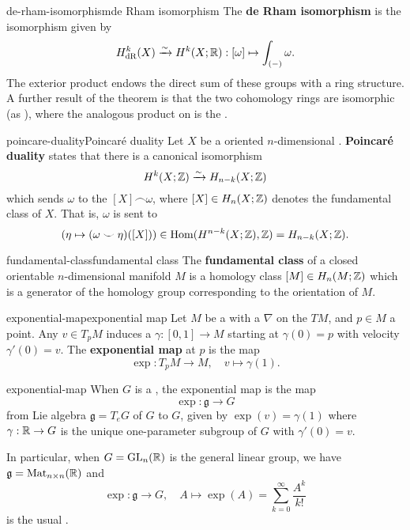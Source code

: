 
\begin{topic}{de-rham-isomorphism}{de Rham isomorphism}
    The \textbf{de Rham isomorphism} is the isomorphism given by
    \[ H_{\textup{dR}}^k(X) \xrightarrow{\sim} H^k(X; \mathbb{R}) : [ \omega ] \mapsto \int_{(-)} \omega . \]
    The exterior product endows the direct sum of these groups with a ring structure. A further result of the theorem is that the two cohomology rings are isomorphic (as ), where the analogous product on  is the .
\end{topic}

\begin{topic}{poincare-duality}{Poincaré duality}
    Let $X$ be a  oriented $n$-dimensional . \textbf{Poincaré duality} states that there is a canonical isomorphism
    \[ H^k(X; \mathbb{Z}) \xrightarrow{\sim} H_{n - k}(X; \mathbb{Z}) \]
    which sends $\omega$ to the  $[X] \frown \omega$, where $[X] \in H_n(X; \mathbb{Z})$ denotes the fundamental class of $X$. That is, $\omega$ is sent to
    \[ (\eta \mapsto (\omega \smile \eta)([X])) \in \text{Hom}(H^{n - k}(X; \mathbb{Z}), \mathbb{Z}) = H_{n - k}(X; \mathbb{Z}) . \]
\end{topic}

\begin{topic}{fundamental-class}{fundamental class}
    The \textbf{fundamental class} of a closed orientable $n$-dimensional manifold $M$ is a homology class $[M] \in H_n(M; \mathbb{Z})$ which is a generator of the homology group corresponding to the orientation of $M$.
\end{topic}

\begin{topic}{exponential-map}{exponential map}
    Let $M$ be a  with a  $\nabla$ on the  $TM$, and $p \in M$ a point. Any  $v \in T_p M$ induces a  $\gamma : [0, 1] \to M$ starting at $\gamma(0) = p$ with velocity $\gamma'(0) = v$. The \textbf{exponential map} at $p$ is the map
    \[ \exp : T_p M \to M, \quad v \mapsto \gamma(1) . \]
\end{topic}

\begin{example}{exponential-map}
    When $G$ is a , the exponential map is the map
    \[ \exp : \mathfrak{g} \to G \]
    from Lie algebra $\mathfrak{g} = T_e G$ of $G$ to $G$, given by $\exp(v) = \gamma(1)$ where $\gamma : \mathbb{R} \to G$ is the unique one-parameter subgroup of $G$ with $\gamma'(0) = v$.
    
    In particular, when $G = \text{GL}_n(\mathbb{R})$ is the general linear group, we have $\mathfrak{g} = \text{Mat}_{n \times n}(\mathbb{R})$ and
    \[ \exp : \mathfrak{g} \to G, \quad A \mapsto \exp(A) = \sum_{k = 0}^{\infty} \frac{A^k}{k!} \]
    is the usual .
\end{example}

